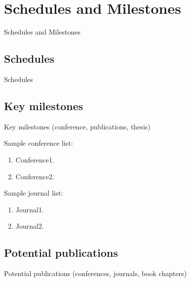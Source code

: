 \chapter{Schedules and Milestones}

Schedules and Milestones

\section{Schedules}

Schedules

\section{Key milestones}

Key milestones (conference, publications, thesis)

Sample conference list:
\begin{enumerate}
\item Conference1.
\item Conference2.
\end{enumerate}

Sample journal list:
\begin{enumerate}
\item Journal1.
\item Journal2.
\end{enumerate}

\section{Potential publications}

Potential publications (conferences, journals, book chapters)